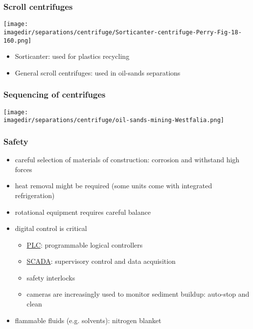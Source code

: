 \begin{frame}\frametitle{Scroll centrifuges}
	\begin{center}
		\texttt{[image: \\imagedir/separations/centrifuge/Sorticanter-centrifuge-Perry-Fig-18-160.png]}
	\end{center}
	\begin{itemize}
		\item	Sorticanter: used for plastics recycling
		\item	General scroll centrifuges: used in oil-sands separations
	\end{itemize}
\end{frame}

\begin{frame}\frametitle{Sequencing of centrifuges}
	\begin{center}
		\texttt{[image: \\imagedir/separations/centrifuge/oil-sands-mining-Westfalia.png]}
	\end{center}
\end{frame}

\begin{frame}\frametitle{Safety}
	\begin{itemize}
		\item	careful selection of materials of construction: corrosion and withstand high forces
		\item	heat removal might be required (some units come with integrated refrigeration)
		\item	rotational equipment requires careful balance
		\item	digital control is critical
		\begin{itemize}
			\item	\href{http://en.wikipedia.org/wiki/Programmable_logic_controller}{PLC}: programmable logical controllers
			\item	\href{http://en.wikipedia.org/wiki/SCADA}{SCADA}: supervisory control and data acquisition
			\item	safety interlocks
			\item	cameras are increasingly used to monitor sediment buildup: auto-stop and clean
		\end{itemize}
		\item	flammable fluids (e.g. solvents): nitrogen blanket
	\end{itemize}
\end{frame}

